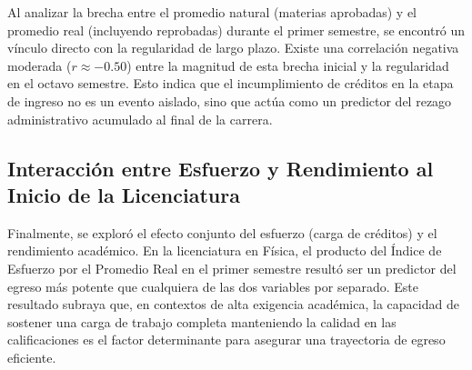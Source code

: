 Al analizar la brecha entre el promedio natural (materias aprobadas) y el promedio real (incluyendo reprobadas) durante el primer semestre, se encontró un vínculo directo con la regularidad de largo plazo. Existe una correlación negativa moderada ($r \approx -0.50$) entre la magnitud de esta brecha inicial y la regularidad en el octavo semestre. Esto indica que el incumplimiento de créditos en la etapa de ingreso no es un evento aislado, sino que actúa como un predictor del rezago administrativo acumulado al final de la carrera.

\subsection{Interacción entre Esfuerzo y Rendimiento al Inicio de la Licenciatura}

Finalmente, se exploró el efecto conjunto del esfuerzo (carga de créditos) y el rendimiento académico. En la licenciatura en Física, el producto del Índice de Esfuerzo por el Promedio Real en el primer semestre resultó ser un predictor del egreso más potente que cualquiera de las dos variables por separado. Este resultado subraya que, en contextos de alta exigencia académica, la capacidad de sostener una carga de trabajo completa manteniendo la calidad en las calificaciones es el factor determinante para asegurar una trayectoria de egreso eficiente.
